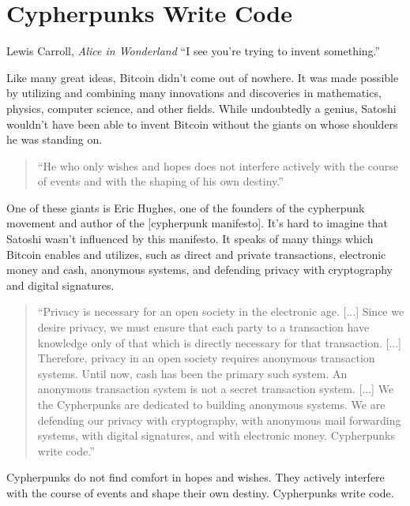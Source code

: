 \chapter{Cypherpunks Write Code}
\label{les:20}

\begin{chapquote}{Lewis Carroll, \textit{Alice in Wonderland}}
``I see you're trying to invent something.''
\end{chapquote}

Like many great ideas, Bitcoin didn't come out of nowhere. It was made
possible by utilizing and combining many innovations and discoveries in
mathematics, physics, computer science, and other fields. While
undoubtedly a genius, Satoshi wouldn't have been able to invent Bitcoin
without the giants on whose shoulders he was standing on.

\begin{quotation}
``He who only wishes and hopes does not interfere actively with the
course of events and with the shaping of his own destiny.''
\end{quotation}

One of these giants is Eric Hughes, one of the founders of the
cypherpunk movement and author of the [cypherpunk manifesto]. It's hard
to imagine that Satoshi wasn't influenced by this manifesto. It speaks
of many things which Bitcoin enables and utilizes, such as direct and
private transactions, electronic money and cash, anonymous systems, and
defending privacy with cryptography and digital signatures.

\begin{quotation}
``Privacy is necessary for an open society in the electronic age.
[...] Since we desire privacy, we must ensure that each party to a
transaction have knowledge only of that which is directly necessary
for that transaction. [...]
Therefore, privacy in an open society requires anonymous transaction
systems. Until now, cash has been the primary such system. An
anonymous transaction system is not a secret transaction system.
[...]
We the Cypherpunks are dedicated to building anonymous systems. We are
defending our privacy with cryptography, with anonymous mail
forwarding systems, with digital signatures, and with electronic
money.
Cypherpunks write code.''
\end{quotation}

Cypherpunks do not find comfort in hopes and wishes. They actively
interfere with the course of events and shape their own destiny.
Cypherpunks write code.

